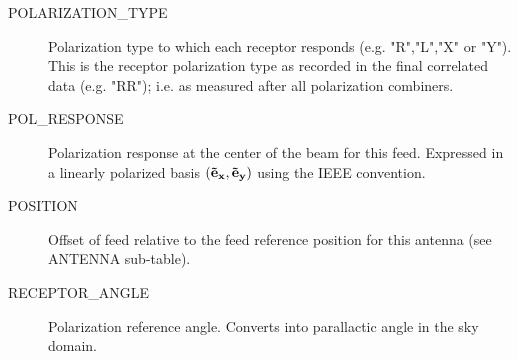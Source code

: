 \documentclass{article}
\begin{document}
\begin{description}
\item[POLARIZATION\_TYPE] Polarization type to which each receptor
responds (e.g. "R","L","X" or "Y"). This is the receptor polarization
type as recorded in the final correlated data (e.g. "RR"); i.e. as
measured after all polarization combiners.

\item[POL\_RESPONSE] Polarization response at the center of the beam
for this feed. Expressed in a linearly polarized basis $({\bf \vec
e_x}, {\bf \vec e_y})$ using the IEEE convention.

\item[POSITION] Offset of feed relative to the feed reference position
for this antenna (see ANTENNA sub-table).

\item[RECEPTOR\_ANGLE] Polarization reference angle. Converts into
parallactic angle in the sky domain.

\end{description}
\end{document}
